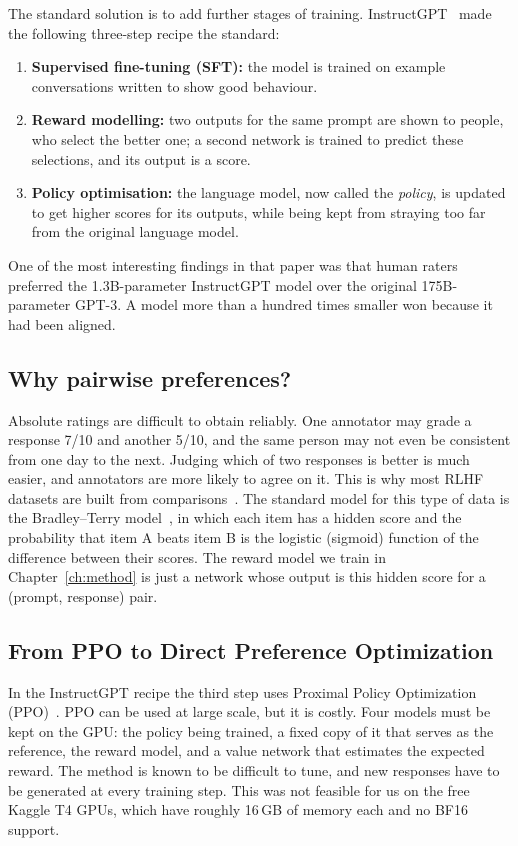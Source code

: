 The standard solution is to add further stages of training. InstructGPT~\cite{ouyang2022instructgpt} made the following three-step recipe the standard:
\begin{enumerate}
  \item \textbf{Supervised fine-tuning (SFT):} the model is trained on example conversations written to show good behaviour.
  \item \textbf{Reward modelling:} two outputs for the same prompt are shown to people, who select the better one; a second network is trained to predict these selections, and its output is a score.
  \item \textbf{Policy optimisation:} the language model, now called the \emph{policy}, is updated to get higher scores for its outputs, while being kept from straying too far from the original language model.
\end{enumerate}
One of the most interesting findings in that paper was that human raters preferred the 1.3B-parameter InstructGPT model over the original 175B-parameter GPT-3. A model more than a hundred times smaller won because it had been aligned.

\subsection{Why pairwise preferences?}
Absolute ratings are difficult to obtain reliably. One annotator may grade a response 7/10 and another 5/10, and the same person may not even be consistent from one day to the next. Judging which of two responses is better is much easier, and annotators are more likely to agree on it. This is why most RLHF datasets are built from comparisons~\cite{christiano2017deep,stiennon2020summarize,bai2022hh}. The standard model for this type of data is the Bradley--Terry model~\cite{bradley1952rank}, in which each item has a hidden score and the probability that item A beats item B is the logistic (sigmoid) function of the difference between their scores. The reward model we train in Chapter~\ref{ch:method} is just a network whose output is this hidden score for a (prompt, response) pair.

\subsection{From PPO to Direct Preference Optimization}
In the InstructGPT recipe the third step uses Proximal Policy Optimization (PPO)~\cite{schulman2017ppo}. PPO can be used at large scale, but it is costly. Four models must be kept on the GPU: the policy being trained, a fixed copy of it that serves as the reference, the reward model, and a value network that estimates the expected reward. The method is known to be difficult to tune, and new responses have to be generated at every training step. This was not feasible for us on the free Kaggle T4 GPUs, which have roughly 16\,GB of memory each and no BF16 support.

